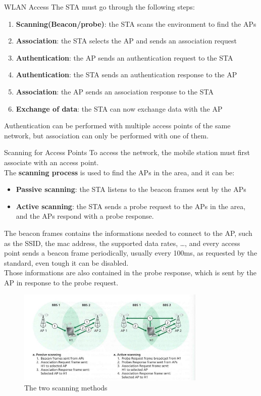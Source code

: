 \begin{section}{WLAN Access}
  The STA must go through the following steps:
  \begin{enumerate}
    \item \textbf{Scanning(Beacon/probe)}: the STA scans the environment to find the APs
    \item \textbf{Association}: the STA selects the AP and sends an association request
    \item \textbf{Authentication}: the AP sends an authentication request to the STA
    \item \textbf{Authentication}: the STA sends an authentication response to the AP
    \item \textbf{Association}: the AP sends an association response to the STA
    \item \textbf{Exchange of data}: the STA can now exchange data with the AP
  \end{enumerate}
  Authentication can be performed with multiple access points of the same network, but association can only
  be performed with one of them.
  \begin{subsection}{Scanning for Access Points}
    To access the network, the mobile station must first associate with an access point.\\
    The \textbf{scanning process} is used to find the APs in the area, and it can be:
    \begin{itemize}
      \item \textbf{Passive scanning}: the STA listens to the beacon frames sent by the APs
      \item \textbf{Active scanning}: the STA sends a probe request to the APs in the area,
        and the APs respond with a probe response.
    \end{itemize}
    The beacon frames contains the informations needed to connect to the AP, such as the SSID, the
    mac address, the supported data rates, \dots, and every access point sends a beacon frame periodically, 
    usually every 100ms, as requested by the standard, even tough it can be disabled.\\
    Those informations are also contained in the probe response, which is sent by the AP in response to the
    probe request.
    \begin{figure}[h]
      \centering
      \includegraphics[width=0.8\textwidth]{img/wireless/wlan scanning.png}
      \caption{The two scanning methods}
    \end{figure}
  \end{subsection}
\end{section}
